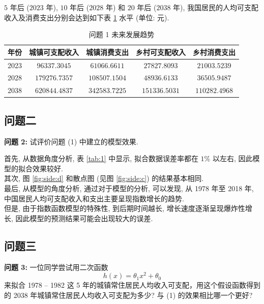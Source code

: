 \documentclass{article}
\begin{document}
$5$ 年后 ($2023$ 年), $10$ 年后 ($2028$ 年) 和 $20$ 年后 ($2038$ 年), 我国居民的人均可支配收入及消费支出分别会达到如下表 \ref{tab:2} 水平 (单位: 元).

\begin{table}[H]
  \centering
  \caption{问题 1 未来发展趋势}
  \label{tab:2}
  \begin{tabular}{ccccc}
    \hline
    \textbf{年份} & \textbf{城镇可支配收入} & \textbf{城镇消费支出} & \textbf{乡村可支配收入} & \textbf{乡村消费支出} \\
    \hline
    2023 & $96337.3045$ & $61066.6611$ & $27827.8093$ & $21003.5239$ \\
    2028 & $179276.7357$ & $108507.1504$ & $48936.6133$ & $36505.9487$ \\
    2038 & $620844.4837$ & $342583.7225$ & $151336.5031$ & $110282.4968$ \\
    \hline
  \end{tabular}
\end{table}

\subsection{问题二}

\begin{mdframed}
\fangsong
\textbf{问题 2:} 试评价问题 (1) 中建立的模型效果.
\end{mdframed}

\indent 首先, 从数据角度分析, 表 \ref{tab:1} 中显示, 拟合数据误差率都在 $1\%$ 以左右, 因此模型的拟合效果较好.\\
\indent 其次, 图 \ref{fig:side:d} 和散点图 (见图 \ref{fig:side:c}) 的结果基本相同.\\
\indent 最后, 从模型的角度分析, 通过对于模型的分析, 可以发现, 从 1978 年至 2018 年, 中国居民人均可支配收入和支出主要呈现指数增长的趋势.\\

但是, 由于指数函数模型的特殊性, 到后期时间越长, 增长速度逐渐呈现爆炸性增长, 因此模型的预测结果可能会出现较大的误差.\\

\subsection{问题三}

\begin{mdframed}
\fangsong
\textbf{问题 3:} 一位同学尝试用二次函数
\begin{equation}
  \label{eq:2}
  h\left(x\right)=\theta_1 x^2+\theta_0
\end{equation}
来拟合 1978 -- 1982 这 5 年的城镇常住居民人均收入可支配，用这个假设函数得到的 2038 年城镇常住居民人均收入可支配为多少? 与 (1) 的效果相比哪一个更好?
\end{mdframed}
\end{document}
